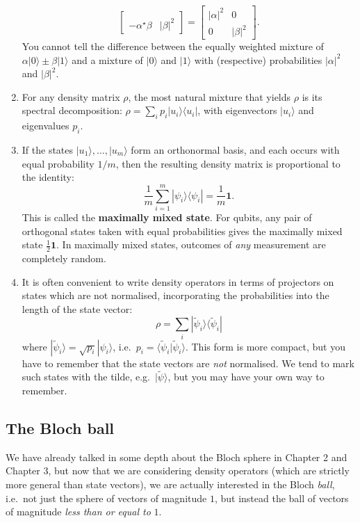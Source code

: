\documentclass[fleqn]{article}
\begin{document}
\begin{enumerate}
\[\begin{bmatrix}
     \\-\alpha^\star\beta & |\beta|^2
     \end{bmatrix}
     =
     \begin{bmatrix}
       |\alpha|^2 & 0
     \\0 & |\beta|^2
     \end{bmatrix}.
   \]
  You cannot tell the difference between the equally weighted mixture of \(\alpha|0\rangle\pm\beta|1\rangle\) and a mixture of \(|0\rangle\) and \(|1\rangle\) with (respective) probabilities \(|\alpha|^2\) and \(|\beta|^2\).
\item
  For any density matrix \(\rho\), the most natural mixture that yields \(\rho\) is its spectral decomposition: \(\rho=\sum_i p_i|u_i\rangle\langle u_i|\), with eigenvectors \(|u_i\rangle\) and eigenvalues \(p_i\).
\item
  If the states \(|u_1\rangle,\ldots,|u_m\rangle\) form an orthonormal basis, and each occurs with equal probability \(1/m\), then the resulting density matrix is proportional to the identity:
  \[
     \frac{1}{m}\sum_{i=1}^m |\psi_i\rangle\langle\psi_i|
     = \frac{1}{m}\mathbf{1}.
   \]
  This is called the \textbf{maximally mixed state}.
  For qubits, any pair of orthogonal states taken with equal probabilities gives the maximally mixed state \(\frac12\mathbf{1}\).
  In maximally mixed states, outcomes of \emph{any} measurement are completely random.
\item
  It is often convenient to write density operators in terms of projectors on states which are not normalised, incorporating the probabilities into the length of the state vector:
  \[
     \rho = \sum_i|\widetilde\psi_i\rangle\langle\widetilde\psi_i|
   \]
  where \(|\widetilde\psi_i\rangle = \sqrt{p_i}|\psi_i\rangle\), i.e.~\(p_i=\langle\widetilde\psi_i|\widetilde\psi_i\rangle\).
  This form is more compact, but you have to remember that the state vectors are \emph{not} normalised.
  We tend to mark such states with the tilde, e.g.~\(|\widetilde\psi\rangle\), but you may have your own way to remember.
\end{enumerate}

\hypertarget{the-bloch-ball}{%
\subsection{The Bloch ball}\label{the-bloch-ball}}

We have already talked in some depth about the Bloch sphere in \protect\hypertarget{chapter2}{}{Chapter 2} and \protect\hypertarget{chapter3}{}{Chapter 3}, but now that we are considering density operators (which are strictly more general than state vectors), we are actually interested in the Bloch \emph{ball}, i.e.~not just the sphere of vectors of magnitude \(1\), but instead the ball of vectors of magnitude \emph{less than or equal to} \(1\).
\end{document}
